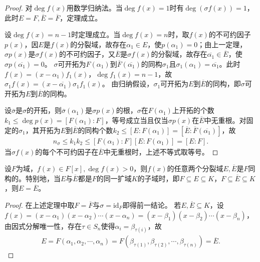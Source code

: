 \documentclass[../../main.tex]{subfiles}%
\begin{document}
\begin{proof}

对$\deg f(x)$用数学归纳法。当$\deg f(x)=1$时有$\deg(\sigma f(x))=1$，此时$E=F,\overline{E}=\overline{F}$，定理成立。

设$\deg f(x)=n-1$时定理成立。当$\deg f(x)=n$时，取$f(x)$的不可约因子$p(x)$，因$E$是$f(x)$的分裂域，故存在$\alpha_1\in E$，使$p(\alpha_1)=0$；由上一定理，$\sigma p(x)$是$\sigma f(x)$的不可约因子，又$\overline{E}$是$\sigma f(x)$的分裂域，故存在$\overline{\alpha_1}\in\overline{E}$，使$\sigma p(\overline{\alpha_1})=0$。
$\sigma$可开拓为$F(\alpha_1)$到$\overline{F}(\overline{\alpha_1})$的同构$\sigma_1$且$\sigma_1(\alpha_1)=\overline{\alpha_1}$。此时$f(x)=(x-\alpha_1)f_1(x)$，$\deg f_1(x)=n-1$，故$\sigma_1 f(x)=(x-\overline{\alpha_1})\sigma_1 f_1(x)$。
由归纳假设，$\sigma_1$可开拓为$E$到$\overline{E}$的同构，即$\sigma$可开拓为$E$到$\overline{E}$的同构。

设$\overline{\sigma}$是$\sigma$的开拓，则$\overline{\sigma}(\alpha_1)$是$\sigma p(x)$的根，$\sigma$在$F(\alpha_1)$上开拓的个数$k_1\leqslant\deg p(x)=[F(\alpha_1):F]$，等号成立当且仅当$\sigma p(x)$在$\overline{E}$中无重根。对固定的$\sigma_1$，其开拓为$E$到$\overline{E}$的同构个数$k_2\leqslant[E:F(\alpha_1)]=[\overline{E}:\overline{F}(\overline{\alpha_1})]$，故
\begin{align*}
n_\sigma\leqslant k_1k_2\leqslant[F(\alpha_1):F][E:F(\alpha_1)]=[E:F].
\end{align*}
当$\sigma f(x)$的每个不可约因子在$\overline{E}$中无重根时，上述不等式取等号。

\end{proof}

\begin{corollary}
设$F$为域，$f(x)\in F[x],\deg f(x)>0$，则$f(x)$的任意两个分裂域$E,\overline{E}$是$F$同构的。特别地，当$E$与$\overline{E}$都是$F$的同一扩域$K$的子域时，即$F\subseteq E\subseteq K$，$F\subseteq\overline{E}\subseteq K$，则$E=\overline{E}$。
\end{corollary}

\begin{proof}

在上述定理中取$F=\overline{F}$与$\sigma=\mathrm{id}_F$即得前一结论。
若$E,\overline{E}\subseteq K$，设$f(x)=(x-\alpha_1)(x-\alpha_2)\cdots(x-\alpha_n)=(x-\beta_1)(x-\beta_2)\cdots(x-\beta_n)$，由因式分解唯一性，存在$\tau\in S_n$使得$\alpha_i=\beta_{\tau(i)}$，故
\begin{align*}
E=F(\alpha_1,\alpha_2,\cdots,\alpha_n)=F(\beta_{\tau(1)},\beta_{\tau(2)},\cdots,\beta_{\tau(n)})=\overline{E}.
\end{align*}

\end{proof}
\end{document}
